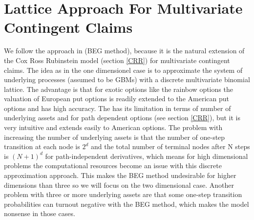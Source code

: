 \section{Lattice Approach For Multivariate Contingent Claims}
We follow the approach in \parencite{BEG} (BEG method), because it is the natural extension of the Cox Ross Rubinstein model (section \ref{CRR}) for multivariate contingent claims. The idea as in the one dimensionel case is to approximate the system of underlying processes (assumed to be GBMs) with a discrete multivariate binomial lattice. The advantage is that for exotic options like the rainbow options the valuation of European put options is readily extended to the American put options and has high accuracy. The \parencite{BEG} has its limitation in terms of number of underlying assets and for path dependent options (see section \ref{CRR}), but it is very intuitive and extends easily to American options. The problem with increasing the number of underlying assets is that the number of one-step transition at each node is $2^d$ and the total number of terminal nodes after N steps is $(N+1)^d$ for path-independent derivatives, which means for high dimensional problems the computational resources become an issue with this discrete approximation approach. This makes the BEG method undesirable for higher dimensions than three so we will focus on the two dimensional case. Another problem with three or more underlying assets are that some one-step transition probabilities can turnout negative with the BEG method, which makes the model nonsense in those cases. \\

